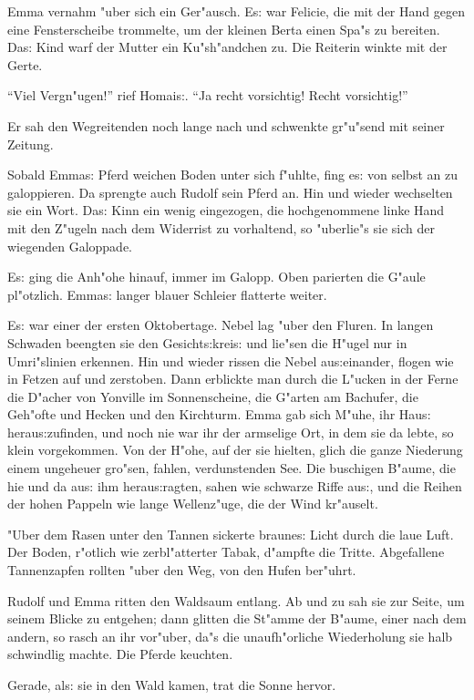 \documentclass[oneside,12pt]{book}
\newcommand{\s}{s:}%
\begin{document}
Emma vernahm "uber sich ein Ger"ausch. E{\s} war Felicie, die mit
der Hand gegen eine Fensterscheibe trommelte, um der kleinen Berta
einen Spa"s zu bereiten. Da{\s} Kind warf der Mutter ein
Ku"sh"andchen zu. Die Reiterin winkte mit der Gerte.

"`Viel Vergn"ugen!"' rief Homai{\s}. "`Ja recht vorsichtig! Recht
vorsichtig!"'

Er sah den Wegreitenden noch lange nach und schwenkte gr"u"send
mit seiner Zeitung.

Sobald Emma{\s} Pferd weichen Boden unter sich f"uhlte, fing e{\s}
von selbst an zu galoppieren. Da sprengte auch Rudolf sein Pferd
an. Hin und wieder wechselten sie ein Wort. Da{\s} Kinn ein wenig
eingezogen, die hochgenommene linke Hand mit den Z"ugeln nach dem
Widerrist zu vorhaltend, so "uberlie"s sie sich der wiegenden
Galoppade.

E{\s} ging die Anh"ohe hinauf, immer im Galopp. Oben parierten die
G"aule pl"otzlich. Emma{\s} langer blauer Schleier flatterte
weiter.

E{\s} war einer der ersten Oktobertage. Nebel lag "uber den
Fluren. In langen Schwaden beengten sie den Gesicht{\s}krei{\s}
und lie"sen die H"ugel nur in Umri"slinien erkennen. Hin und
wieder rissen die Nebel au{\s}einander, flogen wie in Fetzen auf
und zerstoben. Dann erblickte man durch die L"ucken in der Ferne
die D"acher von Yonville im Sonnenscheine, die G"arten am
Bachufer, die Geh"ofte und Hecken und den Kirchturm. Emma gab sich
M"uhe, ihr Hau{\s} herau{\s}zufinden, und noch nie war ihr der
armselige Ort, in dem sie da lebte, so klein vorgekommen. Von der
H"ohe, auf der sie hielten, glich die ganze Niederung einem
ungeheuer gro"sen, fahlen, verdunstenden See. Die buschigen
B"aume, die hie und da au{\s} ihm herau{\s}ragten, sahen wie
schwarze Riffe au{\s}, und die Reihen der hohen Pappeln wie lange
Wellenz"uge, die der Wind kr"auselt.

"Uber dem Rasen unter den Tannen sickerte braune{\s} Licht durch
die laue Luft. Der Boden, r"otlich wie zerbl"atterter Tabak,
d"ampfte die Tritte. Abgefallene Tannenzapfen rollten "uber den
Weg, von den Hufen ber"uhrt.

Rudolf und Emma ritten den Waldsaum entlang. Ab und zu sah sie zur
Seite, um seinem Blicke zu entgehen; dann glitten die St"amme der
B"aume, einer nach dem andern, so rasch an ihr vor"uber, da"s die
unaufh"orliche Wiederholung sie halb schwindlig machte. Die Pferde
keuchten.

Gerade, al{\s} sie in den Wald kamen, trat die Sonne hervor.
\end{document}
